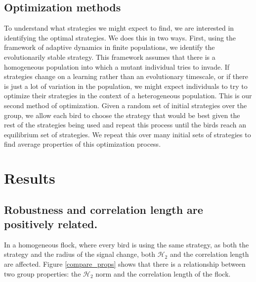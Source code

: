 \documentclass{article}
\begin{document}
\subsection{Optimization methods }
To understand what strategies we might expect to find, we are interested in identifying the optimal strategies.  We does this in two ways.  First, using the framework of adaptive dynamics in finite populations, we identify the evolutionarily stable strategy.  This framework assumes that there is a homogeneous population into which a mutant individual tries to invade.  If strategies change on a learning rather than an evolutionary timescale, or if there is just a lot of variation in the population, we might expect individuals to try to optimize their strategies in the context of a heterogeneous population.  This is our second method of optimization. Given a random set of initial strategies over the group, we allow each bird to choose the strategy that would be best given the rest of the strategies being used and repeat this process until the birds reach an equilibrium set of strategies. We repeat this over many initial sets of strategies to find average properties of this optimization process.

\section{Results }

\subsection{Robustness and correlation length are positively related. }
In a homogeneous flock, where every bird is using the same strategy, as both the strategy and the radius of the signal change, both $\mathscr{H}_2$ and the correlation length are affected.  Figure \ref{compare_props} shows that there is a relationship between two group properties: the $\mathscr{H}_2$ norm and the correlation length of the flock. 
\end{document}
